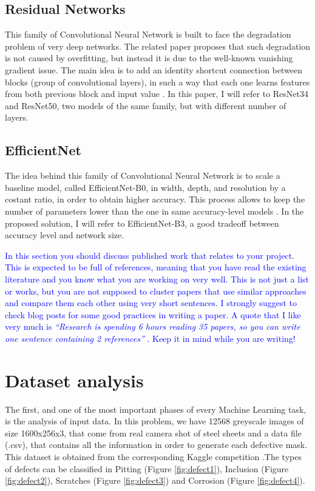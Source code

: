 \documentclass[10pt,twocolumn,letterpaper]{article}
\begin{document}
   \subsection{Residual Networks} 
      This family of Convolutional Neural Network is built to face the degradation problem of very deep networks. The related paper proposes that such degradation is not caused by overfitting, but instead it is due to the well-known vanishing gradient issue. The main idea is to add an identity shortcut connection between blocks (group of convolutional layers), in such a way that each one learns features from both previous block and input value \cite{resnet}.
      In this paper, I will refer to ResNet34 and ResNet50, two models of the same family, but with different number of layers.
   \subsection{EfficientNet}
      The idea behind this family of Convolutional Neural Network is to scale a baseline model, called EfficientNet-B0, in width, depth, and resolution by a costant ratio, in order to obtain higher accuracy. This process allows to keep the number of parameters lower than the one in same accuracy-level models \cite{efficientnet}. In the proposed solution, I will refer to EfficientNet-B3, a good tradeoff between accuracy level and network size.

\textcolor{blue}{
In this section you should discuss published work that relates to your project. This is expected to be full of references, meaning that you have read the existing literature and you know what you are working on very well. This is not just a list or works, but you are not supposed to cluster papers that use similar approaches and compare them each other using very short sentences. I strongly suggest to check \cite{steinhardt, lipton} blog posts for some good practices in writing a paper. A quote that I like very much is \emph{``Research is spending 6 hours reading 35 papers, so you can write one sentence containing 2 references''} \cite{twit:ref}. Keep it in mind while you are writing!
}



\graphicspath{ {./Resources/} }
\section{Dataset analysis}
   The first, and one of the most important phases of every Machine Learning task, is the analysis of input data. In this problem, we have 12568 greyscale images of size 1600x256x3, that come from real camera shot of steel sheets and a data file (.csv), that contains all the information in order to generate each defective mask. This dataset is obtained from the corresponding Kaggle competition \cite{Severstal}.The types of defects can be classified in Pitting (Figure \ref{fig:defect1}), Inclusion (Figure \ref{fig:defect2}), Scratches (Figure \ref{fig:defect3}) and Corrosion (Figure \ref{fig:defect4}).
\end{document}
